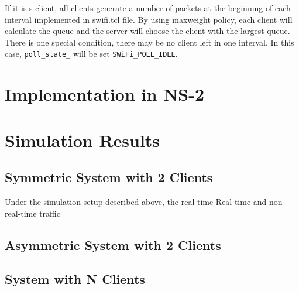 \documentclass{article}
\begin{document}
If it is s client,  all clients generate a number of packets  at the beginning of each interval implemented in swifi.tcl file. By using maxweight policy, each client will calculate the queue and the server will choose the client with the largest queue. There is one special condition, there may be no client left in one interval. In this case, \lstinline |poll_state_| will be set \lstinline |SWiFi_POLL_IDLE|.

\section{Implementation in NS-2}
\label{section: ns2}


\section{Simulation Results}
\label{section: simulation}
\subsection{Symmetric System with 2 Clients}
Under the simulation setup described above, the real-time 
Real-time and non-real-time traffic
\subsection{Asymmetric System with 2 Clients}

\subsection{System with N Clients}
\end{document}
